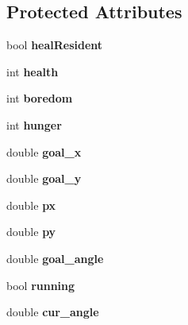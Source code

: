 \subsection*{Protected Attributes}
\begin{DoxyCompactItemize}
\item 
\hypertarget{classDoctor_adab6ec6a93ee2f58b436a8294120f295}{bool {\bfseries heal\-Resident}}\label{classDoctor_adab6ec6a93ee2f58b436a8294120f295}

\item 
\hypertarget{classDoctor_ab1814310e306e7a742ffa9c5c6b913ef}{int {\bfseries health}}\label{classDoctor_ab1814310e306e7a742ffa9c5c6b913ef}

\item 
\hypertarget{classDoctor_a76dcb7e1308ef8001b7960cb542e3824}{int {\bfseries boredom}}\label{classDoctor_a76dcb7e1308ef8001b7960cb542e3824}

\item 
\hypertarget{classDoctor_a7b59e97eb09eed2ffed797d1174ac47f}{int {\bfseries hunger}}\label{classDoctor_a7b59e97eb09eed2ffed797d1174ac47f}

\item 
\hypertarget{classDoctor_ae058c3d6dce31d71ac4e63e3fd653275}{double {\bfseries goal\-\_\-x}}\label{classDoctor_ae058c3d6dce31d71ac4e63e3fd653275}

\item 
\hypertarget{classDoctor_aba0c1163551f144834fc0d68c556fac2}{double {\bfseries goal\-\_\-y}}\label{classDoctor_aba0c1163551f144834fc0d68c556fac2}

\item 
\hypertarget{classDoctor_a6ea729b1a8fc6d33176d768ef62b0a43}{double {\bfseries px}}\label{classDoctor_a6ea729b1a8fc6d33176d768ef62b0a43}

\item 
\hypertarget{classDoctor_a04b4b5bddd2b99b6eb4b7b8813eeeebf}{double {\bfseries py}}\label{classDoctor_a04b4b5bddd2b99b6eb4b7b8813eeeebf}

\item 
\hypertarget{classDoctor_a27377808d49670322af2ce4ec34730f1}{double {\bfseries goal\-\_\-angle}}\label{classDoctor_a27377808d49670322af2ce4ec34730f1}

\item 
\hypertarget{classDoctor_a2f7dffac0f8141914640e8f9bee5e7ff}{bool {\bfseries running}}\label{classDoctor_a2f7dffac0f8141914640e8f9bee5e7ff}

\item 
\hypertarget{classDoctor_ab67e7a3eab1a57a0cfa52d84fe52414d}{double {\bfseries cur\-\_\-angle}}\label{classDoctor_ab67e7a3eab1a57a0cfa52d84fe52414d}


\end{DoxyCompactItemize}
